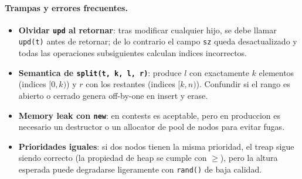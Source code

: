 \paragraph{Trampas y errores frecuentes.}
\begin{itemize}\setlength\itemsep{0pt}
	\item \textbf{Olvidar \texttt{upd} al retornar}: tras modificar cualquier hijo, se debe llamar \verb|upd(t)| antes de retornar; de lo contrario el campo \verb|sz| queda desactualizado y todas las operaciones subsiguientes calculan indices incorrectos.
	\item \textbf{Semantica de \texttt{split(t, k, l, r)}}: produce $l$ con exactamente $k$ elementos (indices $[0, k)$) y $r$ con los restantes (indices $[k, n)$). Confundir si el rango es abierto o cerrado genera off-by-one en insert y erase.
	\item \textbf{Memory leak con \texttt{new}}: en contests es aceptable, pero en produccion es necesario un destructor o un allocator de pool de nodos para evitar fugas.
	\item \textbf{Prioridades iguales}: si dos nodos tienen la misma prioridad, el treap sigue siendo correcto (la propiedad de heap se cumple con $\ge$), pero la altura esperada puede degradarse ligeramente con \verb|rand()| de baja calidad.
\end{itemize}

